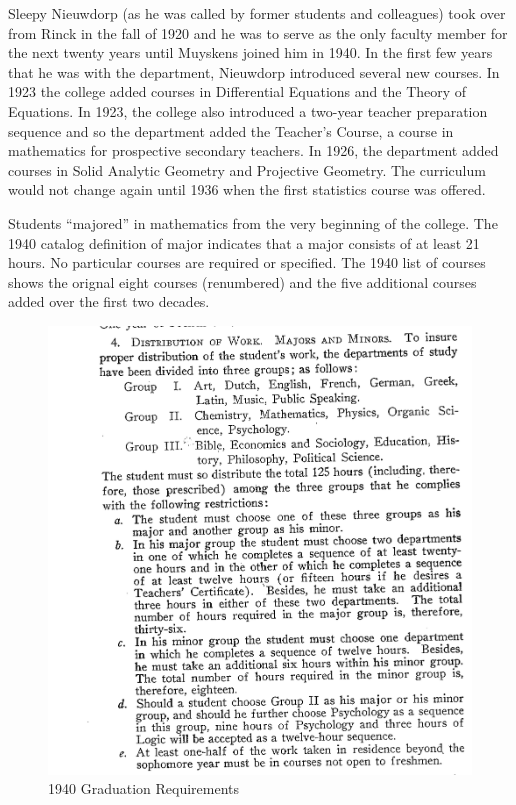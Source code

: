 \documentclass[
]{book}
\begin{document}
Sleepy Nieuwdorp (as he was called by former students and colleagues) took over from Rinck in the fall of 1920 and he was to serve as the only faculty member for the next twenty years until Muyskens joined him in 1940. In the first few years that he was with the department, Nieuwdorp introduced several new courses. In 1923 the college added courses in Differential Equations and the Theory of Equations. In 1923, the college also introduced a two-year teacher preparation sequence and so the department added the Teacher's Course, a course in mathematics for prospective secondary teachers. In 1926, the department added courses in Solid Analytic Geometry and Projective Geometry. The curriculum would not change again until 1936 when the first statistics course was offered.

Students ``majored'' in mathematics from the very beginning of the college. The 1940 catalog definition of major indicates that a major consists of at least 21 hours. No particular courses are required or specified. The 1940 list of courses shows the orignal eight courses (renumbered) and the five additional courses added over the first two decades.

\begin{figure}

{\centering \includegraphics[width=13.68in]{images/1940MajorDef} 

}

\caption{1940 Graduation Requirements}\label{fig:1940cat}
\end{figure}
\end{document}
